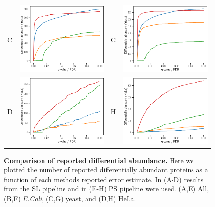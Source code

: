 \documentclass[11pt]{article}
\begin{document}
\begin{figure}[hbt]
\begin{tabular}{lclc}
        C & \includegraphics[width=0.4\linewidth]{../../result/report_plots_filtered/osw_de_yeast.png} & 
        G & \includegraphics[width=0.4\linewidth]{../../result/report_plots_filtered/diann_de_yeast.png} \\ 
        D & \includegraphics[width=0.4\linewidth]{../../result/report_plots_filtered/osw_de_human.png} &
        H & \includegraphics[width=0.4\linewidth]{../../result/report_plots_filtered/diann_de_human.png} 
    \end{tabular}
    \caption{{\bf Comparison of reported differential abundance.} Here we plotted the number of reported differentially abundant proteins as a function of each methods reported error estimate. In (A-D) results from the SL pipeline and in (E-H) PS pipeline were used. 
    (A,E) All, (B,F) \textit{E.Coli}, (C,G) yeast, and (D,H) HeLa. \label{fig:da_methods_esimate}}
\end{figure}
\end{document}
